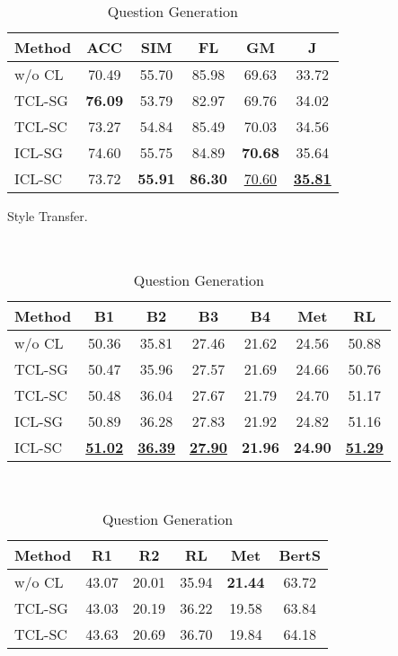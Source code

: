 \begin{table}[th!]
\begin{subtable}{\linewidth}
\begin{tabular}{lccccc}
			\hline
			{Method} &  {ACC} & {SIM} & {FL} & {GM} & {J}\\
			\hline
			w/o CL & 70.49 & 55.70 & 85.98 & 69.63 &33.72 \\
			TCL-SG & \textbf{76.09} & 53.79 & 82.97 & 69.76 & 34.02 \\
			\hline
			TCL-SC& 73.27 & 54.84 & 85.49 & 70.03 & 34.56\\
			ICL-SG & 74.60 & 55.75 & 84.89 & \textbf{70.68} & 35.64\\
			ICL-SC & 73.72 & \textbf{55.91} & \textbf{86.30} & \underline{{70.60}} & \underline{\textbf{35.81}} \\
			\hline
		\end{tabular}
		\caption{Style Transfer.}
		\label{tab:end2endst}
	\end{subtable}
	\\[5pt]
	\begin{subtable}{\linewidth}
		\scriptsize
		\centering
		\begin{tabular}{lcccccc}
			\hline
			{Method} & {B1} & {B2} & {B3} & {B4} & {Met} & {RL}\\
			\hline
			w/o CL & {50.36} & 35.81 & 27.46 & 21.62 & 24.56 & 50.88 \\
			TCL-SG &{50.47} & 35.96 & 27.57 & 21.69 & 24.66 & 50.76\\
			\hline
			TCL-SC & 50.48 & 36.04 & 27.67 & 21.79 & 24.70 & 51.17\\
			ICL-SG & 50.89 & 36.28 & 27.83 & 21.92 & 24.82 & 51.16\\
			ICL-SC &  \underline{\textbf{51.02}} & \underline{\textbf{36.39}} & \underline{\textbf{27.90}} & \textbf{21.96} & \textbf{24.90} & \underline{\textbf{51.29}} \\
			\hline
		\end{tabular}
		\caption{Question Generation}
		\label{tab:end2endqg}
	\end{subtable}
	\\[5pt]
	\begin{subtable}{\linewidth}
		\scriptsize
		\centering
		\begin{tabular}{lccccc}
			\hline
			{Method} & {R1} & {R2} & {RL} & {Met} & {BertS}\\
			\hline
			w/o CL &  43.07 & 20.01 & 35.94 & \textbf{21.44} & 63.72 \\
			TCL-SG & 43.03 & 20.19 & 36.22 & 19.58 & 63.84 \\
			\hline
			TCL-SC & 43.63 & 20.69 & 36.70 & 19.84 & 64.18 \\

\end{tabular}
\end{subtable}
\end{table}
